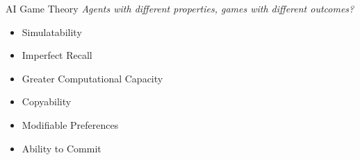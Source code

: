 \documentclass[aspectratio=169]{beamer}
\begin{document}
\begin{frame}{AI Game Theory}
\centering
\textit{Agents with different properties, games with different outcomes?}
\pause
\vspace{0.5cm}

\begin{itemize}
    \item Simulatability \pause \parencite{cooper_characterising_2024, kovarik_game_2024}\pause
    \item Imperfect Recall \pause \parencite{chen_imperfect_2024}\pause
    \item Greater Computational Capacity \pause
    \item Copyability \pause
    \item Modifiable Preferences \pause
    \item Ability to Commit
\end{itemize}
\end{frame}
\end{document}
